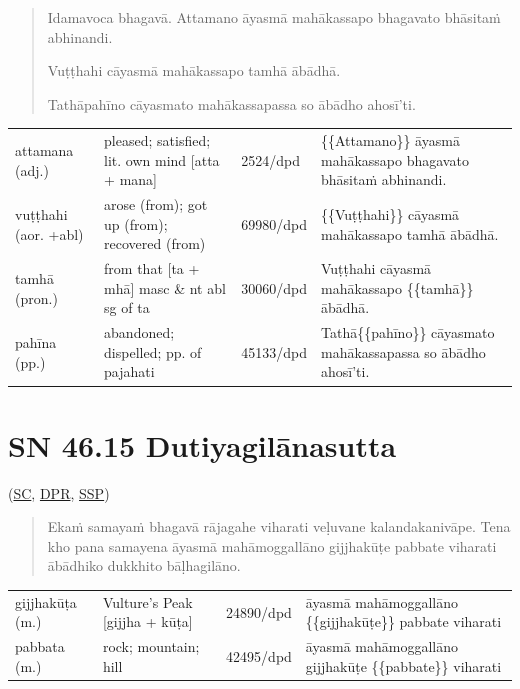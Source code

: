 \documentclass[11pt,oneside]{memoir}
\begin{document}
\clearpage
\casesLegendHeaderBGHere

\begin{quote}
Idamavoca bhagavā. Attamano āyasmā mahākassapo bhagavato bhāsitaṁ abhinandi.

Vuṭṭhahi cāyasmā mahākassapo tamhā ābādhā.

Tathāpahīno cāyasmato mahākassapassa so ābādho ahosī'ti.
\end{quote}

\begin{longtable}{L{\colOne} L{\colTwo} H H}
attamana (adj.) & pleased; satisfied; lit. own mind [atta + mana] & 2524/dpd & \{\{Attamano\}\} āyasmā mahākassapo bhagavato bhāsitaṁ abhinandi.\\[0pt]
vuṭṭhahi (aor. +abl) & arose (from); got up (from); recovered (from) & 69980/dpd & \{\{Vuṭṭhahi\}\} cāyasmā mahākassapo tamhā ābādhā.\\[0pt]
tamhā (pron.) & from that [ta + mhā] masc \& nt abl sg of ta & 30060/dpd & Vuṭṭhahi cāyasmā mahākassapo \{\{tamhā\}\} ābādhā.\\[0pt]
pahīna (pp.) & abandoned; dispelled; pp. of pajahati & 45133/dpd & Tathā\{\{pahīno\}\} cāyasmato mahākassapassa so ābādho ahosī'ti.\\[0pt]
\end{longtable}

\section{SN 46.15 Dutiyagilānasutta}
\label{sec:orga107a5c}

(\href{https://suttacentral.net/sn46.15/pli/ms}{SC}, \href{https://www.digitalpalireader.online/\_dprhtml/index.html?loc=s.4.0.0.1.1.4.m}{DPR}, \href{http://localhost:4848/suttas/sn46.15/pli/ms?window\_type=Sutta+Study}{SSP})

\begin{quote}
Ekaṁ samayaṁ bhagavā rājagahe viharati veḷuvane kalandakanivāpe.
Tena kho pana samayena āyasmā mahāmoggallāno gijjhakūṭe pabbate viharati
ābādhiko dukkhito bāḷhagilāno.
\end{quote}

\begin{longtable}{L{\colOne} L{\colTwo} H H}
gijjhakūṭa (m.) & Vulture's Peak [gijjha + kūṭa] & 24890/dpd & āyasmā mahāmoggallāno \{\{gijjhakūṭe\}\} pabbate viharati\\[0pt]
pabbata (m.) & rock; mountain; hill & 42495/dpd & āyasmā mahāmoggallāno gijjhakūṭe \{\{pabbate\}\} viharati\\[0pt]
\end{longtable}
\end{document}
